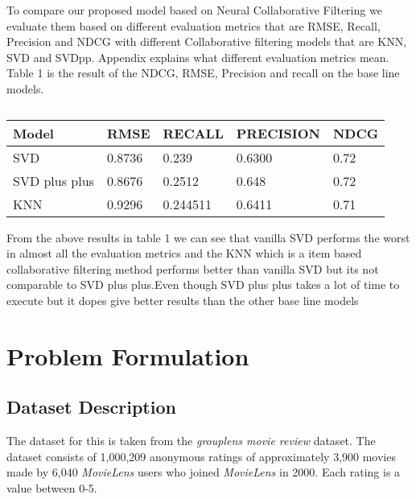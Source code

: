 \documentclass[sigconf]{acmart}
\begin{document}
To compare our proposed model based on Neural Collaborative Filtering we evaluate them based on different evaluation metrics that are RMSE, Recall, Precision and NDCG with different  Collaborative filtering models that are KNN, SVD and SVDpp. Appendix explains what different evaluation metrics mean.
Table 1 is the result of the NDCG, RMSE, Precision and recall on the base line models.

\begin{table}[]
\begin{tabular}{|l|l|l|l|l|}
\hline
\textbf{Model} & \textbf{RMSE} & \textbf{RECALL} & \textbf{PRECISION} & \textbf{NDCG} \\ \hline
SVD            & 0.8736        & 0.239           & 0.6300             & 0.72          \\ \hline
SVD plus plus  & 0.8676        & 0.2512          & 0.648              & 0.72          \\ \hline
KNN            & 0.9296        & 0.244511        & 0.6411             & 0.71          \\ \hline

\end{tabular}
\caption{}
\end{table}

From the above results in table 1 we can see that vanilla SVD performs the worst in almost all the evaluation metrics and the KNN which is a item based collaborative filtering method performs better than vanilla SVD but its not comparable to SVD plus plus.Even though SVD plus plus takes a lot of time to execute but it dopes give better results than the other base line models 

\section{Problem Formulation}
\subsection{Dataset Description}
The dataset for this is taken from the \emph{grouplens movie review} dataset. The dataset consists of 1,000,209 anonymous ratings of approximately 3,900 movies  made by 6,040 \emph{MovieLens} users who joined \emph{MovieLens} in 2000. Each rating is a value between 0-5. 
\end{document}
